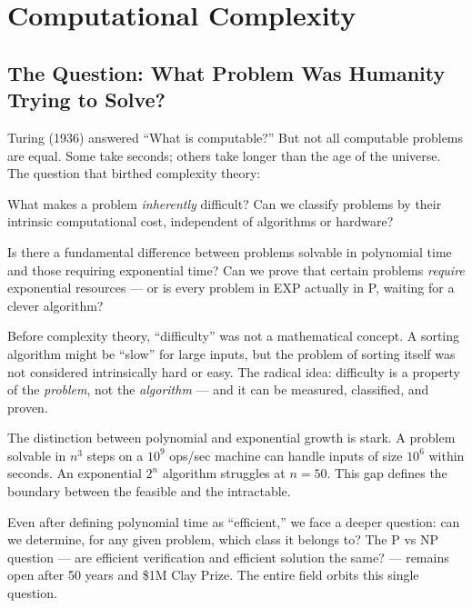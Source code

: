 
\chapter{Computational Complexity}
\label{ch:complexity}

\section{The Question: What Problem Was Humanity Trying to Solve?}
\label{sec:complexity:question}

Turing (1936) answered ``What is computable?'' But not all computable problems are equal. Some take seconds; others take longer than the age of the universe. The question that birthed complexity theory:

What makes a problem \emph{inherently} difficult? Can we classify problems by their intrinsic computational cost, independent of algorithms or hardware?

Is there a fundamental difference between problems solvable in polynomial time and those requiring exponential time? Can we prove that certain problems \emph{require} exponential resources — or is every problem in EXP actually in P, waiting for a clever algorithm?

Before complexity theory, ``difficulty'' was not a mathematical concept. A sorting algorithm might be ``slow'' for large inputs, but the problem of sorting itself was not considered intrinsically hard or easy. The radical idea: difficulty is a property of the \emph{problem}, not the \emph{algorithm} — and it can be measured, classified, and proven.

The distinction between polynomial and exponential growth is stark. A problem solvable in $n^3$ steps on a $10^9$ ops/sec machine can handle inputs of size $10^6$ within seconds. An exponential $2^n$ algorithm struggles at $n = 50$. This gap defines the boundary between the feasible and the intractable.

Even after defining polynomial time as ``efficient,'' we face a deeper question: can we determine, for any given problem, which class it belongs to? The P vs NP question — are efficient verification and efficient solution the same? — remains open after 50 years and \$1M Clay Prize. The entire field orbits this single question.

